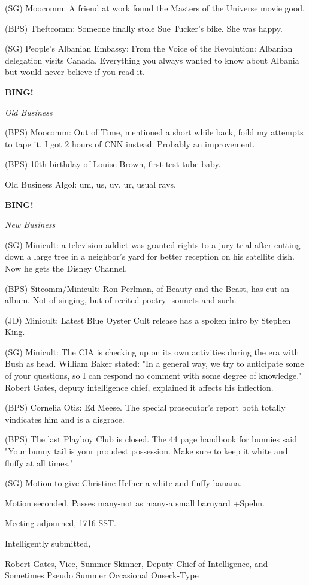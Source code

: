 \documentclass[12pt]{article}
\newcommand{\bing}{{\bf BING!} }
\newcommand{\goto}[1]{\bing \vskip 12pt \centerline{{\em{#1}}}}
\begin{document}
(SG) Moocomm: A friend at work found the Masters of the Universe movie good.

(BPS) Theftcomm: Someone finally stole Sue Tucker's bike. She was happy.

(SG) People's Albanian Embassy: From the Voice of the Revolution: Albanian delegation visits Canada. Everything you always wanted to know about Albania but would never believe if you read it.

\goto{Old Business}

(BPS) Moocomm: Out of Time, mentioned a short while back, foild my attempts to tape it. I got 2 hours of CNN instead. Probably an improvement.

(BPS) 10th birthday of Louise Brown, first test tube baby.

Old Business Algol: um, us, uv, ur, usual ravs.

\goto{New Business}

(SG) Minicult: a television addict was granted rights to a jury trial after cutting down a large tree in a neighbor's yard for better reception on his satellite dish. Now he gets the Disney Channel.

(BPS) Sitcomm/Minicult: Ron Perlman, of Beauty and the Beast, has cut an album. Not of singing, but of recited poetry- sonnets and such.

(JD) Minicult: Latest Blue Oyster Cult release has a spoken intro by Stephen King.

(SG) Minicult: The CIA is checking up on its own activities during the era with Bush as head. William Baker stated: "In a general way, we try to anticipate some of your questions, so I can respond no comment with some degree of knowledge." Robert Gates, deputy intelligence chief, explained it affects his inflection.

(BPS) Cornelia Otis: Ed Meese. The special prosecutor's report both totally vindicates him and is a disgrace.

(BPS) The last Playboy Club is closed. The 44 page handbook for bunnies said "Your bunny tail is your proudest possession. Make sure to keep it white and fluffy at all times."

(SG) Motion to give Christine Hefner a white and fluffy banana.

Motion seconded. Passes many-not as many-a small barnyard +Spehn.

\vspace{12pt}

\noindent
Meeting adjourned, 1716 SST.

\vspace{18pt}

\centerline{Intelligently submitted,}
\centerline{Robert Gates, Vice, Summer Skinner, Deputy Chief of Intelligence, and Sometimes Pseudo Summer Occasional Onseck-Type}
\end{document}
